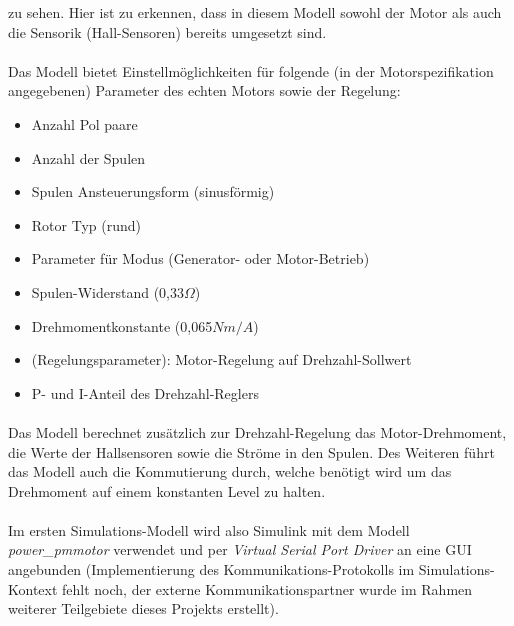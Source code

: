 zu sehen. Hier ist zu erkennen, dass in diesem Modell sowohl der Motor als auch die Sensorik (Hall-Sensoren) bereits umgesetzt sind. 

\paragraph{}
Das Modell bietet Einstellmöglichkeiten für folgende (in der Motorspezifikation angegebenen) Parameter des echten Motors sowie der Regelung:
\begin{itemize}
	\item Anzahl Pol paare
	\item Anzahl der Spulen
	\item Spulen Ansteuerungsform (sinusförmig)
	\item Rotor Typ (rund)
	\item Parameter für Modus (Generator- oder Motor-Betrieb)
	\item Spulen-Widerstand (0,33$\Omega$) 
	\item Drehmomentkonstante (0,065$Nm/A$)
	\item (Regelungsparameter): Motor-Regelung auf Drehzahl-Sollwert 
	\item P- und I-Anteil des Drehzahl-Reglers
\end{itemize}

\paragraph{}
Das Modell berechnet zusätzlich zur Drehzahl-Regelung das Motor-Drehmoment, die Werte der Hallsensoren sowie die Ströme in den Spulen. Des Weiteren führt das Modell auch die Kommutierung durch, welche benötigt wird um das Drehmoment auf einem konstanten Level zu halten.

\paragraph{}
Im ersten Simulations-Modell wird also Simulink mit dem Modell \textit{power\_pmmotor} verwendet und per \textit{Virtual Serial Port Driver} an eine GUI angebunden (Implementierung des Kommunikations-Protokolls im Simulations-Kontext fehlt noch, der externe Kommunikationspartner wurde im Rahmen weiterer Teilgebiete dieses Projekts erstellt).


